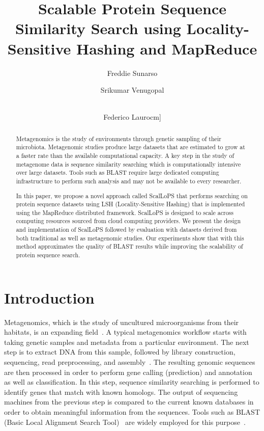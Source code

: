 \documentclass[titlepage]{csetr}
\title{Scalable Protein Sequence Similarity Search using Locality-Sensitive Hashing and MapReduce 
}
\author{Freddie Sunarso \and Srikumar Venugopal \and\\ Federico Lauro\3cm]
}
\date{}
\begin{document}
\maketitle

\begin{abstract}
Metagenomics is the study of environments through genetic sampling of their microbiota. Metagenomic studies produce large datasets that are estimated to grow at a faster rate than the available computational capacity. A key step in the study of metagenome data is sequence similarity searching which is computationally intensive over large datasets. Tools such as BLAST require large dedicated computing infrastructure to perform such analysis and may not be available to every researcher. 

In this paper, we propose a novel approach called ScalLoPS that performs searching on protein sequence datasets using LSH (Locality-Sensitive Hashing) that is implemented using the MapReduce distributed framework. ScalLoPS is designed to scale across computing resources sourced from cloud computing providers. We present the design and implementation of ScalLoPS followed by evaluation with datasets derived from both traditional as well as metagenomic studies. Our experiments show that with this method approximates the quality of BLAST results while improving the scalability of protein sequence search.
\end{abstract}

\section{Introduction}
\label{sec:Intro}

Metagenomics, which is the study of uncultured microorganisms from their habitats, is an expanding field~\cite{Metagenomics}. A typical metagenomics workflow starts with taking genetic samples and metadata from a particular environment. The next step is to extract DNA from this sample, followed by library construction, sequencing, read preprocessing, and assembly~\cite{Metagenomics2}. The resulting genomic sequences are then processed in order to perform gene calling (prediction) and annotation as well as classification. In this step, sequence similarity searching is performed to identify genes that match with known homologs. The output of sequencing machines from the previous step is compared to the current known databases in order to obtain meaningful information from the sequences. Tools such as BLAST (Basic Local Alignment Search Tool)~\cite{BLAST,GappedBLAST} are widely employed for this purpose~\cite{wooley_metagenomics_2010}. 
\end{document}
